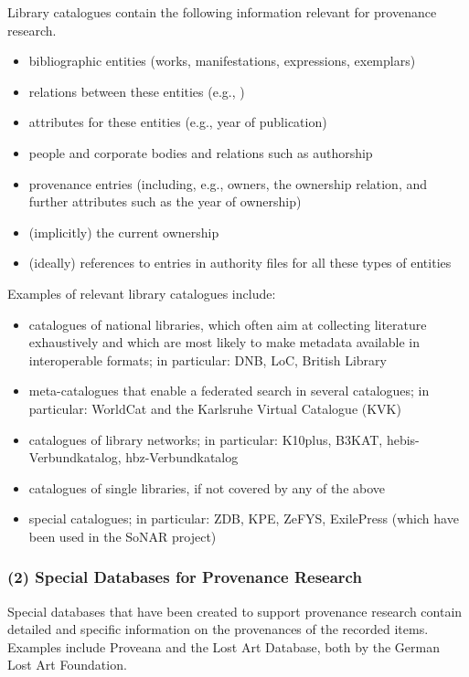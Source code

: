 Library catalogues contain the following information relevant for provenance research.
%
\begin{itemize}
  \item
    bibliographic entities (works, manifestations, expressions, exemplars)
  \item
    relations between these entities (e.g., )
  \item
    attributes for these entities (e.g., year of publication)
  \item
    people and corporate bodies and relations such as authorship
  \item
    provenance entries (including, e.g., owners, the ownership relation, and further attributes such as the year of ownership)
  \item
    (implicitly) the current ownership
  \item
    (ideally) references to entries in authority files for all these types of entities
\end{itemize}
%
Examples of relevant library catalogues include:
%
\begin{itemize}
  \item
    catalogues of national libraries, which often aim at collecting literature exhaustively
    and which are most likely to make metadata available in interoperable formats;
    in particular: \gls{DNB}, \gls{LoC}, British Library 
  \item
    meta-catalogues that enable a federated search in several catalogues;
    in particular: WorldCat and the Karlsruhe Virtual Catalogue (KVK)
  \item
    catalogues of library networks;
    in particular: K10plus, B3KAT, hebis-Verbundkatalog, hbz-Verbundkatalog
  \item
    catalogues of single libraries, if not covered by any of the above
  \item
    special catalogues;
    in particular: \gls{ZDB}, \gls{KPE}, ZeFYS, ExilePress (which have been used in the \gls{SoNAR} project) 
\end{itemize}

\subsubsection{(2) Special Databases for Provenance Research}

Special databases that have been created to support provenance research contain detailed and specific information on
the provenances of the recorded items.
Examples include Proveana and the Lost Art Database, both by the German Lost Art Foundation. 

